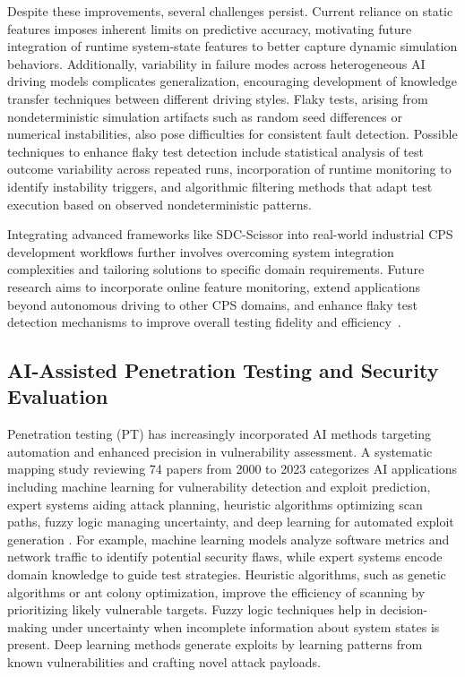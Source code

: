 \documentclass[sigconf]{acmart}
\begin{document}
Despite these improvements, several challenges persist. Current reliance on static features imposes inherent limits on predictive accuracy, motivating future integration of runtime system-state features to better capture dynamic simulation behaviors. Additionally, variability in failure modes across heterogeneous AI driving models complicates generalization, encouraging development of knowledge transfer techniques between different driving styles. Flaky tests, arising from nondeterministic simulation artifacts such as random seed differences or numerical instabilities, also pose difficulties for consistent fault detection. Possible techniques to enhance flaky test detection include statistical analysis of test outcome variability across repeated runs, incorporation of runtime monitoring to identify instability triggers, and algorithmic filtering methods that adapt test execution based on observed nondeterministic patterns.

Integrating advanced frameworks like SDC-Scissor into real-world industrial CPS development workflows further involves overcoming system integration complexities and tailoring solutions to specific domain requirements. Future research aims to incorporate online feature monitoring, extend applications beyond autonomous driving to other CPS domains, and enhance flaky test detection mechanisms to improve overall testing fidelity and efficiency~\cite{ref29}.

\subsection{AI-Assisted Penetration Testing and Security Evaluation}

Penetration testing (PT) has increasingly incorporated AI methods targeting automation and enhanced precision in vulnerability assessment. A systematic mapping study reviewing 74 papers from 2000 to 2023 categorizes AI applications including machine learning for vulnerability detection and exploit prediction, expert systems aiding attack planning, heuristic algorithms optimizing scan paths, fuzzy logic managing uncertainty, and deep learning for automated exploit generation \cite{ref31}. For example, machine learning models analyze software metrics and network traffic to identify potential security flaws, while expert systems encode domain knowledge to guide test strategies. Heuristic algorithms, such as genetic algorithms or ant colony optimization, improve the efficiency of scanning by prioritizing likely vulnerable targets. Fuzzy logic techniques help in decision-making under uncertainty when incomplete information about system states is present. Deep learning methods generate exploits by learning patterns from known vulnerabilities and crafting novel attack payloads.
\end{document}
